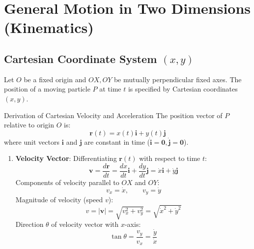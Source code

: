 \chapter{General Motion in Two Dimensions (Kinematics)}

\section{Cartesian Coordinate System $(x, y)$}

Let $O$ be a fixed origin and $OX, OY$ be mutually perpendicular fixed axes. The position of a moving particle $P$ at time $t$ is specified by Cartesian coordinates $(x, y)$.

\begin{proofbox}{Derivation of Cartesian Velocity and Acceleration}
The position vector of $P$ relative to origin $O$ is:
\begin{equation}
    \mathbf{r}(t) = x(t) \mathbf{i} + y(t) \mathbf{j}
\end{equation}
where unit vectors $\mathbf{i}$ and $\mathbf{j}$ are constant in time ($\dot{\mathbf{i}} = \mathbf{0}, \dot{\mathbf{j}} = \mathbf{0}$).

\begin{enumerate}[leftmargin=1.5em]
    \item \textbf{Velocity Vector}:
    Differentiating $\mathbf{r}(t)$ with respect to time $t$:
    \begin{equation}
        \mathbf{v} = \frac{d\mathbf{r}}{dt} = \frac{dx}{dt} \mathbf{i} + \frac{dy}{dt} \mathbf{j} = \dot{x} \mathbf{i} + \dot{y} \mathbf{j}
    \end{equation}
    Components of velocity parallel to $OX$ and $OY$:
    \begin{equation}
        v_x = \dot{x}, \qquad v_y = \dot{y}
    \end{equation}
    Magnitude of velocity (speed $v$):
    \begin{equation}
        v = |\mathbf{v}| = \sqrt{v_x^2 + v_y^2} = \sqrt{\dot{x}^2 + \dot{y}^2}
    \end{equation}
    Direction $\theta$ of velocity vector with $x$-axis:
    \begin{equation}
        \tan\theta = \frac{v_y}{v_x} = \frac{\dot{y}}{\dot{x}}
    \end{equation}


\end{enumerate}
\end{proofbox}

